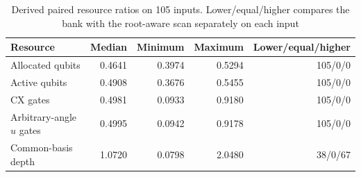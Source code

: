 \begin{table}[t]
\caption{Derived paired resource ratios on 105 inputs. Lower/equal/higher compares the bank with the root-aware scan separately on each input}\label{tab:resources}
\centering\small
\begin{tabular}{lrrrr}
\toprule
Resource & Median & Minimum & Maximum & Lower/equal/higher\\
\midrule
Allocated qubits & 0.4641 & 0.3974 & 0.5294 & 105/0/0\\
Active qubits & 0.4908 & 0.3676 & 0.5455 & 105/0/0\\
CX gates & 0.4981 & 0.0933 & 0.9180 & 105/0/0\\
Arbitrary-angle $u$ gates & 0.4995 & 0.0942 & 0.9178 & 105/0/0\\
Common-basis depth & 1.0720 & 0.0798 & 2.0480 & 38/0/67\\
\bottomrule
\end{tabular}
\end{table}